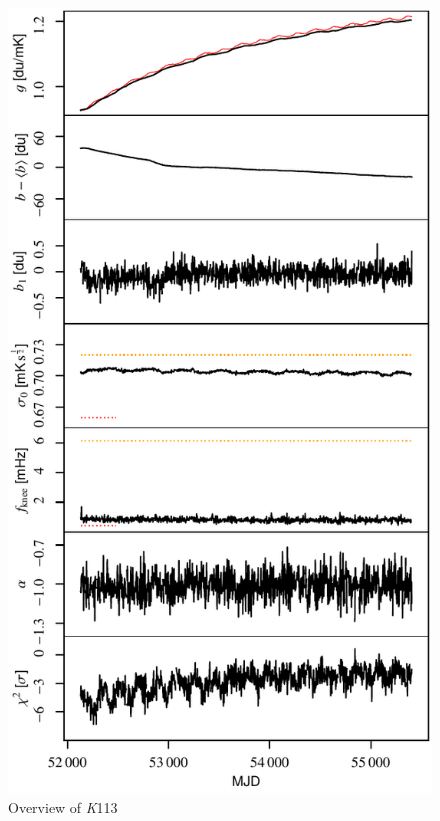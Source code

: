 \documentclass[twocolumn]{../../common/aa}
\newcommand{\K}[0]{\textit K}
\begin{document}
\begin{figure}[t]
  	\centering
	\includegraphics[width=\linewidth]{figures/instpar_CG_K113_v1.pdf}
	\caption{Overview of \K113}
	\label{fig:inst_K113}
\end{figure}
\end{document}
